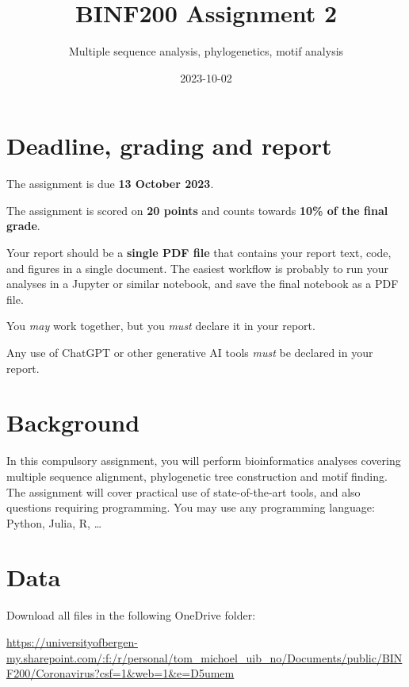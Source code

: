 \documentclass[
  a4paper,
  DIV=11,
  numbers=noendperiod]{scrartcl}
\title{BINF200 Assignment 2}
\author{Multiple sequence analysis, phylogenetics, motif analysis}
\date{2023-10-02}
\begin{document}
\maketitle
\ifdefined\Shaded\renewenvironment{Shaded}{\begin{tcolorbox}[sharp corners, breakable, borderline west={3pt}{0pt}{shadecolor}, interior hidden, boxrule=0pt, enhanced, frame hidden]}{\end{tcolorbox}}\fi

\hypertarget{deadline-grading-and-report}{%
\section{Deadline, grading and
report}\label{deadline-grading-and-report}}

The assignment is due \textbf{13 October 2023}.

The assignment is scored on \textbf{20 points} and counts towards
\textbf{10\% of the final grade}.

Your report should be a \textbf{single PDF file} that contains your
report text, code, and figures in a single document. The easiest
workflow is probably to run your analyses in a Jupyter or similar
notebook, and save the final notebook as a PDF file.

You \emph{may} work together, but you \emph{must} declare it in your
report.

Any use of ChatGPT or other generative AI tools \emph{must} be declared
in your report.

\hypertarget{background}{%
\section{Background}\label{background}}

In this compulsory assignment, you will perform bioinformatics analyses
covering multiple sequence alignment, phylogenetic tree construction and
motif finding. The assignment will cover practical use of
state-of-the-art tools, and also questions requiring programming. You
may use any programming language: Python, Julia, R, \ldots{}

\hypertarget{data}{%
\section{Data}\label{data}}

Download all files in the following OneDrive folder:

\url{https://universityofbergen-my.sharepoint.com/:f:/r/personal/tom_michoel_uib_no/Documents/public/BINF200/Coronavirus?csf=1\&web=1\&e=D5umem}
\end{document}
